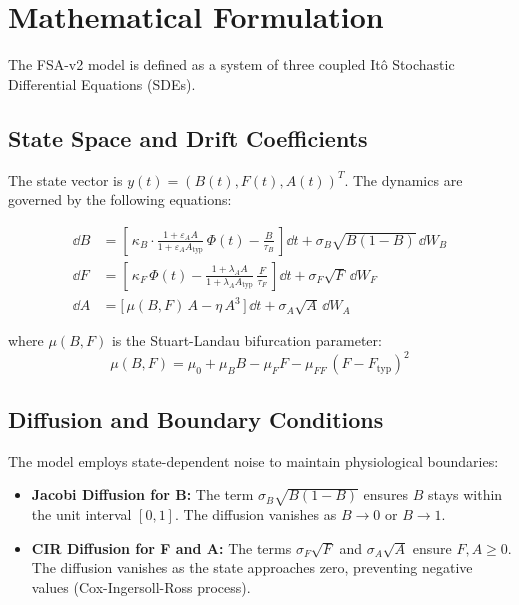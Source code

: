 \section{Mathematical Formulation} \label{sec:math}

The FSA-v2 model is defined as a system of three coupled Itô Stochastic Differential Equations (SDEs).

\subsection{State Space and Drift Coefficients}

The state vector is $y(t) = (B(t), F(t), A(t))^T$. The dynamics are governed by the following equations:

\begin{align}
  \dd B &= \left[\,\kappa_B \cdot \frac{1+\varepsilon_A A}{1+\varepsilon_A A_{\mathrm{typ}}}\,\Phi(t)
                  - \frac{B}{\tau_B}\,\right]\dd t
            + \sigma_B \sqrt{B(1-B)}\,\dd W_B \\
  \dd F &= \left[\,\kappa_F\,\Phi(t)
                  - \frac{1+\lambda_A A}{1+\lambda_A A_{\mathrm{typ}}}\,
                    \frac{F}{\tau_F}\,\right]\dd t
            + \sigma_F \sqrt{F}\,\dd W_F \\
  \dd A &= \bigl[\,\mu(B,F)\,A - \eta\,A^3\,\bigr]\,\dd t
            + \sigma_A \sqrt{A}\,\dd W_A
\end{align}

where $\mu(B,F)$ is the Stuart-Landau bifurcation parameter:
\begin{equation}
  \mu(B,F) = \mu_0 + \mu_B B - \mu_F F - \mu_{FF}\,(F - F_{\mathrm{typ}})^2
\end{equation}

\subsection{Diffusion and Boundary Conditions}

The model employs state-dependent noise to maintain physiological boundaries:
\begin{itemize}
    \item \textbf{Jacobi Diffusion for B:} The term $\sigma_B \sqrt{B(1-B)}$ ensures $B$ stays within the unit interval $[0, 1]$. The diffusion vanishes as $B \to 0$ or $B \to 1$.
    \item \textbf{CIR Diffusion for F and A:} The terms $\sigma_F \sqrt{F}$ and $\sigma_A \sqrt{A}$ ensure $F, A \ge 0$. The diffusion vanishes as the state approaches zero, preventing negative values (Cox-Ingersoll-Ross process).
\end{itemize}

